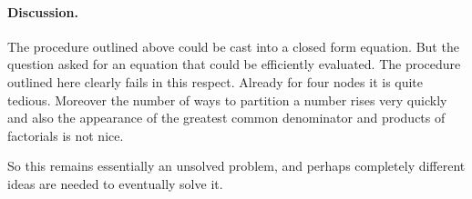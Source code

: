 \paragraph{Discussion.} The procedure outlined above could be cast into a closed form equation. But the question asked for an equation that could be efficiently evaluated. The procedure outlined here clearly fails in this respect. Already for four nodes it is quite tedious. Moreover the number of ways to partition a number rises very quickly and also the appearance of the greatest common denominator and products of factorials is not nice. 

So this remains essentially an unsolved problem, and perhaps completely different ideas are needed to eventually solve it. 

\solutionend
